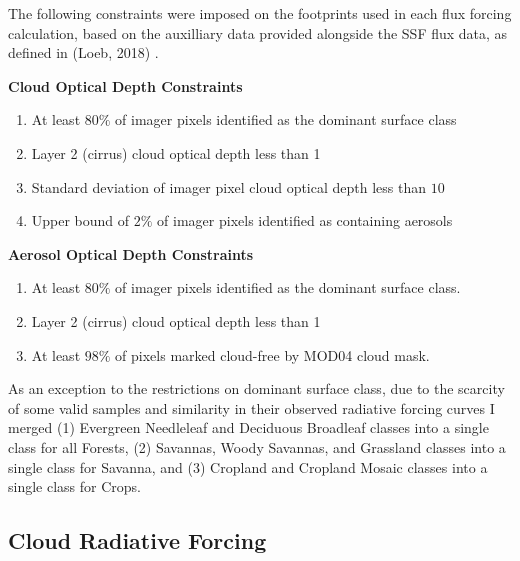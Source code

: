 \documentclass[12pt]{article}
\begin{document}
    The following constraints were imposed on the footprints used in each flux forcing calculation, based on the auxilliary data provided alongside the SSF flux data, as defined in (Loeb, 2018) \cite{loeb_503_2018}.

    \vspace{1em}

    \noindent
    \textbf{Cloud Optical Depth Constraints}
    \vspace{-1em}
    \begin{enumerate}[itemsep=0pt, parsep=0pt, before=\setlength{\baselineskip}{6mm}]
        \item At least $80\%$ of imager pixels identified as the dominant surface class
        \item Layer 2 (cirrus) cloud optical depth less than 1
        \item Standard deviation of imager pixel cloud optical depth less than $10$
        \item Upper bound of $2\%$ of imager pixels identified as containing aerosols
    \end{enumerate}

    \noindent
    \textbf{Aerosol Optical Depth Constraints}
    \vspace{-1em}
    \begin{enumerate}[itemsep=0pt, parsep=0pt, before=\setlength{\baselineskip}{6mm}]
        \item At least $80\%$ of imager pixels identified as the dominant surface class.
        \item Layer 2 (cirrus) cloud optical depth less than 1
        \item At least $98\%$ of pixels marked cloud-free by MOD04 cloud mask.
    \end{enumerate}

    As an exception to the restrictions on dominant surface class, due to the scarcity of some valid samples and similarity in their observed radiative forcing curves I merged (1) Evergreen Needleleaf and Deciduous Broadleaf classes into a single class for all Forests, (2) Savannas, Woody Savannas, and Grassland classes into a single class for Savanna, and (3) Cropland and Cropland Mosaic classes into a single class for Crops.


    \subsection{Cloud Radiative Forcing}
\end{document}
